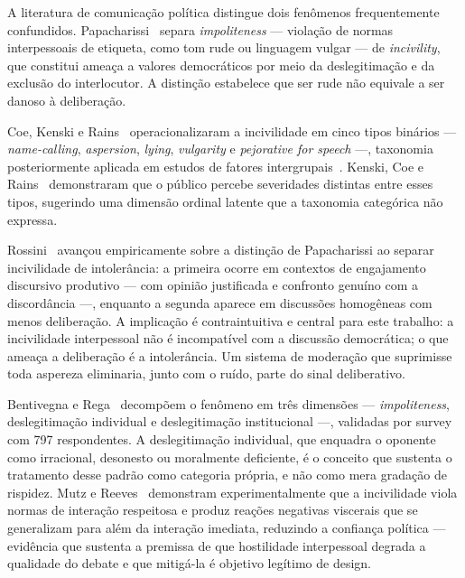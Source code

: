 \documentclass[conference]{IEEEtran} \IEEEoverridecommandlockouts %
\begin{document}
A literatura de comunicação política distingue dois fenômenos frequentemente
confundidos. Papacharissi~\cite{papacharissi2004democracy} separa
\textit{impoliteness} — violação de normas interpessoais de etiqueta, como tom
rude ou linguagem vulgar — de \textit{incivility}, que constitui ameaça a
valores democráticos por meio da deslegitimação e da exclusão do interlocutor.
A distinção estabelece que ser rude não equivale a ser danoso à deliberação.

Coe, Kenski e Rains~\cite{coe2014online} operacionalizaram a incivilidade em
cinco tipos binários — \textit{name-calling}, \textit{aspersion},
\textit{lying}, \textit{vulgarity} e \textit{pejorative for speech} —, taxonomia
posteriormente aplicada em estudos de fatores intergrupais~\cite{rains2017incivility}.
Kenski, Coe e Rains~\cite{kenski2020perceptions} demonstraram que o público
percebe severidades distintas entre esses tipos, sugerindo uma dimensão
ordinal latente que a taxonomia categórica não expressa.

Rossini~\cite{rossini2022beyond} avançou empiricamente sobre a distinção de
Papacharissi ao separar incivilidade de intolerância: a primeira ocorre em
contextos de engajamento discursivo produtivo — com opinião justificada e
confronto genuíno com a discordância —, enquanto a segunda aparece em
discussões homogêneas com menos deliberação. A implicação é contraintuitiva e
central para este trabalho: a incivilidade interpessoal não é incompatível com
a discussão democrática; o que ameaça a deliberação é a intolerância. Um
sistema de moderação que suprimisse toda aspereza eliminaria, junto com o
ruído, parte do sinal deliberativo.

Bentivegna e Rega~\cite{bentivegna2022searching} decompõem o fenômeno em três
dimensões — \textit{impoliteness}, deslegitimação individual e deslegitimação
institucional —, validadas por survey com 797 respondentes. A deslegitimação
individual, que enquadra o oponente como irracional, desonesto ou moralmente
deficiente, é o conceito que sustenta o tratamento desse padrão como categoria
própria, e não como mera gradação de rispidez. Mutz e Reeves~\cite{mutz2005new}
demonstram experimentalmente que a incivilidade viola normas de interação
respeitosa e produz reações negativas viscerais que se generalizam para além da
interação imediata, reduzindo a confiança política — evidência que sustenta a
premissa de que hostilidade interpessoal degrada a qualidade do debate e que
mitigá-la é objetivo legítimo de design.
\end{document}

